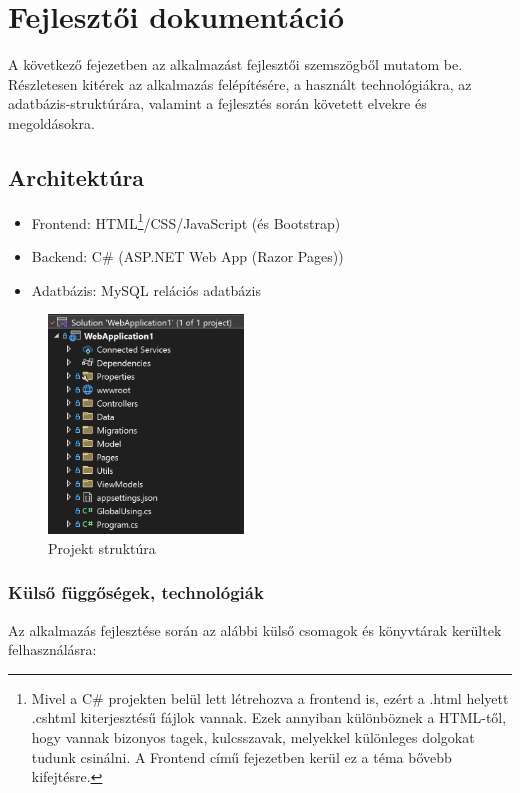 \chapter{Fejlesztői dokumentáció}
\label{ch:impl}
 A következő fejezetben az alkalmazást fejlesztői szemszögből mutatom be. Részletesen kitérek az alkalmazás felépítésére, a használt technológiákra, az adatbázis-struktúrára, valamint a fejlesztés során követett elvekre és megoldásokra.

\section{Architektúra}
\begin{itemize}
	\item Frontend: HTML\footnote{Mivel a C\# projekten
		belül lett létrehozva a frontend is, ezért a .html helyett .cshtml
		kiterjesztésű fájlok vannak. Ezek annyiban különböznek a 
		HTML-től, hogy vannak bizonyos tagek, kulcsszavak, melyekkel
		különleges dolgokat tudunk csinálni. A Frontend című fejezetben kerül ez a téma bővebb kifejtésre.}/CSS/JavaScript (és Bootstrap)
	\item Backend: C\# (ASP.NET Web App (Razor Pages))
	\item Adatbázis: MySQL relációs adatbázis
\end{itemize}

\begin{figure}[H]
	\centering
	\includegraphics[height=220px]{img/solution-explorer-screenshot}
	\caption{Projekt struktúra}
	\label{fig:project-structure}
\end{figure}

\subsection{Külső függőségek, technológiák}

Az alkalmazás fejlesztése során az alábbi külső csomagok és könyvtárak kerültek felhasználásra:

